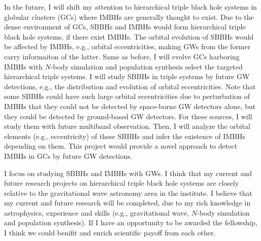 \documentclass[12pt,a4paper,sans]{article}%
\begin{document}
In the future, I will shift my attention to hierarchical triple black hole systems in globular clusters (GCs) where
IMBHs are generally thought to exist. Due to the dense environment of GCs, SBBHs and IMBHs would form hierarchical
triple black hole systems, if there exist IMBHs. The orbital evolution of SBBHs would be affected by IMBHs, e.g.,
orbital eccentricities, making GWs
from the former carry informaiton of the latter. Same as before, I will evolve GCs harboring IMBHs with $N$-body
simulation and population synthesis
select the targeted hierarchical triple systems. I will study SBBHs in triple systems by future GW detections,
e.g., the distribution and evolution of orbital
eccentricities. Note that some SBBHs could have such large orbital eccentricities due to perturbation of IMBHs that they
could not be
detected by space-borne GW detectors alone, but they could be detected by ground-based GW detectors. For these sources,
I will study them with future multiband observation. Then, I will analyze the orbital elements (e.g., eccentricity) of
these SBBHs and infer the existence of IMBHs depending on them. This project would provide a novel approach to detect IMBHs in GCs by future GW detections.  

I focus on studying SBBHs and IMBHs with GWs. I think that my current and future research projects on
hierarchical triple
black hole systems are closely relative to the gravitational wave astronomy area in the institute. I believe that my current and future research will be completed, due to my rich knowledge in astrophysics,
experience and skills (e.g., gravitational wave, $N$-body
simulation and population synthesis). If I have an opportunity to be awarded the fellowship, I think we could benifit and enrich scientific payoff from each other. 




%
\end{document}
